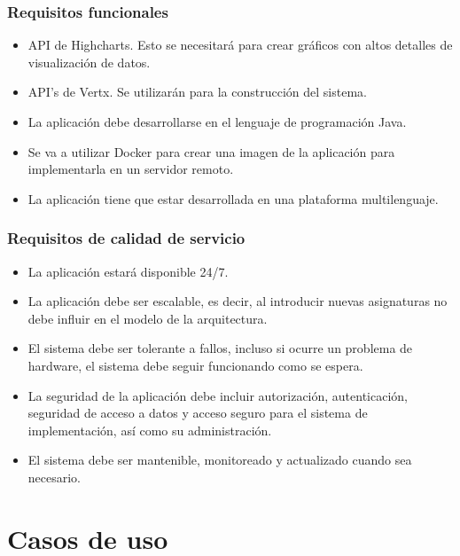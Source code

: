 \subsubsection{Requisitos funcionales}
\begin{itemize}
\item {API de Highcharts. Esto se necesitará para crear gráficos con altos detalles de visualización de datos.}
\item {API’s de Vertx. Se utilizarán para la construcción del sistema. }
\item {La aplicación debe desarrollarse en el lenguaje de programación Java.}
\item {Se va a utilizar Docker para crear una imagen de la aplicación para implementarla en un servidor remoto.}
\item {La aplicación tiene que estar desarrollada en una plataforma multilenguaje.}
\end{itemize}
\subsubsection{Requisitos de calidad de servicio}
\begin{itemize}
\item {La aplicación estará disponible 24/7.}
\item {La aplicación debe ser escalable, es decir, al introducir nuevas asignaturas no debe influir en el modelo de la arquitectura.}
\item {El sistema debe ser tolerante a fallos, incluso si ocurre un problema de hardware, el sistema debe seguir funcionando como se espera.}
\item {La seguridad de la aplicación debe incluir autorización, autenticación, seguridad de acceso a datos y acceso seguro para el sistema de implementación, así como su administración.}
\item {El sistema debe ser mantenible, monitoreado y actualizado cuando sea necesario.}
\end{itemize}
\section{Casos de uso}
